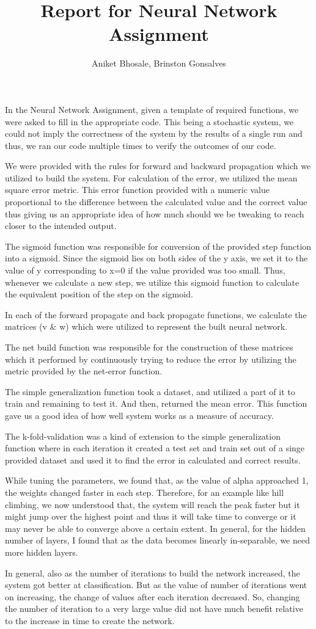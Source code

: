 \documentclass[]{article}
\title{ Report for Neural Network Assignment}
\author{ Aniket Bhosale, Brinston Gonsalves}
\begin{document}
\maketitle


In the Neural Network Assignment, given a template of required functions, we were asked to fill in the appropriate code. This being a stochastic system, we could not imply the correctness of the system by the results of a single run and thus, we ran our code multiple times to verify the outcomes of our code.

We were provided with the rules for forward and backward propagation which we utilized to build the system. For calculation of the error, we utilized the mean square error metric. This error function provided with a numeric value proportional to the difference between the calculated value and the correct value thus giving us an appropriate idea of how much should we be tweaking to reach closer to the intended output.

The sigmoid function was responsible for conversion of the provided step function into a sigmoid. Since the sigmoid lies on both sides of the y axis, we set it to the value of y corresponding to x=0 if the value provided was too small. Thus, whenever we calculate a new step, we utilize this sigmoid function to calculate the equivalent position of the step on the sigmoid.

In each of the forward propagate and back propagate functions, we calculate the matrices (v \& w) which were utilized to represent the built neural network.

The net build function was responsible for the construction of these matrices which it performed by continuously trying to reduce the error by utilizing the metric provided by the net-error function.

The simple generalization function took a dataset, and utilized a part of it to train and remaining to test it. And then, returned the mean error. This function gave us a good idea of how well system works as a measure of accuracy.

The k-fold-validation was a kind of extension to the simple generalization function where in each iteration it created a test set and train set out of a singe provided dataset and used it to find the error in calculated and correct results.

While tuning the parameters, we found that, as the value of alpha approached 1, the weights changed faster in each step. Therefore, for an example like hill climbing, we now understood that, the system will reach the peak faster but it might jump over the highest point and thus it will take time to converge or it may never be able to converge above a certain extent. In general, for the hidden number of layers, I found that as the data becomes linearly in-separable, we need more hidden layers.
   

In general, also as the number of iterations to build the network increased, the system got better at classification. But as the value of number of iterations went on increasing, the change of values after each iteration decreased. So, changing the number of iteration to a very large value did not have much benefit relative to the increase in time to create the network.   

 
\end{document}
